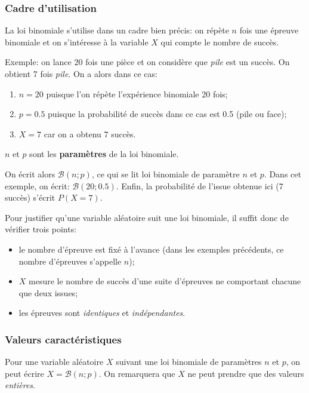 \documentclass[a4paper,12pt]{scrartcl}
\begin{document}
\subsubsection{Cadre d'utilisation}\label{par:cadre}

La loi binomiale s'utilise dans un cadre bien précis: on répète $n$ fois une épreuve binomiale et on s'intéresse à la variable $X$ qui compte le nombre de succès.

Exemple: on lance 20 fois une pièce et on considère que \emph{pile} est un succès. On obtient 7 fois \emph{pile}. On a alors dans ce cas:

\begin{enumerate}
 \item $n = 20$ puisque l'on répète l'expérience binomiale 20 fois;
 \item $p = 0.5$ puisque la probabilité de succès dans ce cas est 0.5 (pile ou face);
 \item $X = 7$ car on a obtenu 7 succès.
\end{enumerate}

$n$ et $p$ sont les \textbf{paramètres} de la loi binomiale. 

On écrit alors $\mathcal{B}(n;p)$, ce qui se lit \og{}loi binomiale de paramètre $n$ et $p$\fg{}. Dans cet exemple, on écrit: $\mathcal{B}(20;0.5)$. Enfin, la probabilité de l'issue obtenue ici (7 succès) s'écrit $P(X=7)$. 

Pour justifier qu'une variable aléatoire suit une loi binomiale, il suffit donc de vérifier trois points:

\begin{itemize}
 \item le nombre d'épreuve est fixé à l'avance (dans les exemples précédents, ce nombre d'épreuves s'appelle $n$);
 \item $X$ mesure le nombre de succès d'une suite d'épreuves ne comportant chacune que deux issues;
 \item les épreuves sont \textit{identiques} et \textit{indépendantes}.
\end{itemize}

\subsubsection{Valeurs caractéristiques}
Pour une variable aléatoire $X$ suivant une loi binomiale de paramètres $n$ et $p$, on peut écrire $X = \mathcal{B}(n;p)$. On remarquera que $X$ ne peut prendre que des valeurs \emph{entières}.
\end{document}
